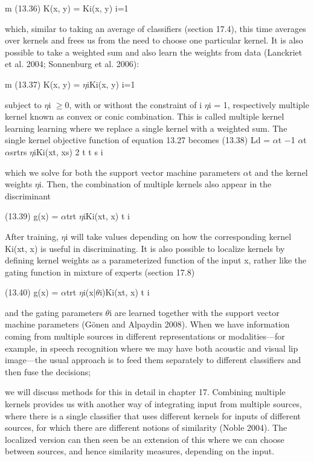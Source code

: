 m (13.36) K(x, y) = Ki(x, y) i=1

which, similar to taking an average of classifiers (section 17.4), this time averages over kernels and frees us from the need to choose one particular kernel. It is also possible to take a weighted sum and also learn the weights from data (Lanckriet et al. 2004; Sonnenburg et al. 2006):

m (13.37) K(x, y) = $\eta$iKi(x, y) i=1

subject to $\eta$i $\geq$0, with or without the constraint of i $\eta$i = 1, respectively multiple kernel known as convex or conic combination. This is called multiple kernel learning learning where we replace a single kernel with a weighted sum. The single kernel objective function of equation 13.27 becomes (13.38) Ld = $\alpha$t $-$1 $\alpha$t$\alpha$srtrs $\eta$iKi(xt, xs) 2 t t s i

which we solve for both the support vector machine parameters $\alpha$t and the kernel weights $\eta$i. Then, the combination of multiple kernels also appear in the discriminant

(13.39) g(x) = $\alpha$trt $\eta$iKi(xt, x) t i

After training, $\eta$i will take values depending on how the corresponding kernel Ki(xt, x) is useful in discriminating. It is also possible to localize kernels by defining kernel weights as a parameterized function of the input x, rather like the gating function in mixture of experts (section 17.8)

(13.40) g(x) = $\alpha$trt $\eta$i(x|$\theta$i)Ki(xt, x) t i

and the gating parameters $\theta$i are learned together with the support vector machine parameters (Gönen and Alpaydin 2008). When we have information coming from multiple sources in different representations or modalities---for example, in speech recognition where we may have both acoustic and visual lip image---the usual approach is to feed them separately to different classifiers and then fuse the decisions;

we will discuss methods for this in detail in chapter 17. Combining multiple kernels provides us with another way of integrating input from multiple sources, where there is a single classifier that uses different kernels for inputs of different sources, for which there are different notions of similarity (Noble 2004). The localized version can then seen be an extension of this where we can choose between sources, and hence similarity measures, depending on the input.

